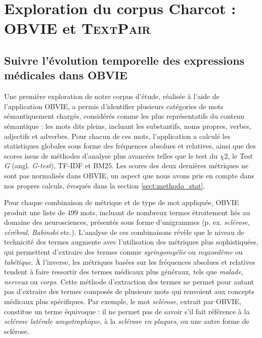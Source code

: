 \section{Exploration du corpus Charcot : \textsc{OBVIE} et \textsc{TextPair}}
\subsection{Suivre l'évolution temporelle des expressions médicales dans \textsc{OBVIE}}
\label{subsect:obvie_textpair}
Une première exploration de notre corpus d'étude, réalisée à l'aide de l'application \textsc{OBVIE}, a permis d'identifier plusieurs catégories de mots sémantiquement chargés, considérés comme les plus représentatifs du contenu sémantique : les mots dits \og{}pleins\fg{}, incluant les substantifs, noms propres, verbes, adjectifs et adverbes. Pour chacun de ces mots, l'application a calculé les statistiques globales sous forme des fréquences absolues et relatives, ainsi que des scores issus de méthodes d'analyse plus avancées telles que le test du \textsc{$\chi$2}, le Test \textit{G} (angl. \textit{G-test}), \textsc{TF-IDF} et \textsc{BM25}. Les scores des deux dernières métriques ne sont pas normalisés dans \textsc{OBVIE}, un aspect que nous avons pris en compte dans nos propres calculs, évoqués dans la section \ref{sect:methodo_stat}. 

Pour chaque combinaison de métrique et de type de mot appliquée, \textsc{OBVIE} produit une liste de 499 mots, incluant de nombreux termes étroitement liés au domaine des neurosciences, présentés sous forme d'unigrammes (p. ex. \textit{sclérose}, \textit{cérébral}, \textit{Babinski} etc.). L'analyse de ces combinaisons révèle que le niveau de technicité des termes augmente avec l'utilisation des métriques plus sophistiquées, qui permettent d'extraire des termes comme \textit{syringomyélie} ou \textit{myxoedème} ou \textit{tabétique}. À l'inverse, les métriques basées sur les fréquences absolues et relatives tendent à faire ressortir des termes médicaux plus généraux, tels que \textit{malade}, \textit{nerveux} ou \textit{corps}. Cette méthode d'extraction des termes ne permet pour autant pas d'extraire des termes composés de plusieurs mots qui renvoient aux concepts médicaux plus spécifiques. Par exemple, le mot \textit{sclérose}, extrait par \textsc{OBVIE}, constitue un terme équivoque : il ne permet pas de savoir s'il fait référence à la \textit{sclérose latérale amyotrophique}, à la \textit{sclérose en plaques}, ou une autre forme de sclérose. 

